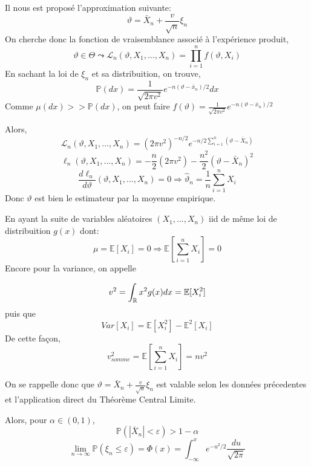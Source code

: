 \documentclass{article}
\newcommand{\mean}{\mathbb{E}}
\newcommand{\R}{\mathbb{R}}
\begin{document}
Il nous est proposé l'approximation suivante:
$$\vartheta=\bar X_n + \frac{v}{\sqrt{n}}\xi_n$$
On cherche donc la fonction de vraisemblance associé à l'expérience produit,
$$\vartheta \in \Theta \leadsto \mathcal{L}_n(\vartheta,X_1,...,X_n )= \prod_{i=1}^nf(\vartheta,X_i) $$
En sachant la loi de $\displaystyle \xi_n$ et sa distribuition, on trouve,
$$\mathbb{P}(dx)=\frac{1}{\sqrt{2\pi v^2}}e^{-n(\vartheta-\bar x_n)/2}dx$$
Comme $\displaystyle \mu(dx)>> \mathbb{P}(dx)$, on peut faire $\displaystyle f(\vartheta)=\frac{1}{\sqrt{2\pi v^2}}e^{-n(\vartheta-\bar x_n)/2}$

Alors,
$$\mathcal{L}_n(\vartheta,X_1,...,X_n )=(2\pi v^2)^{-n/2}e^{-n/2\sum_{i=1}^n(\vartheta - \bar X_ n)}$$
$$\ell_n(\vartheta,X_1,...,X_n )=-\frac{n}{2}(2\pi v^2)-\frac{n^2}{2}(\vartheta-\bar X_n)^2$$
$$\frac{d\ell_n}{d\vartheta}(\vartheta,X_1,...,X_n )=0 \Rightarrow\hat \vartheta_n=\frac{1}{n}\sum_{i=1}^nX_i$$
Donc $\displaystyle \vartheta$ est bien le estimateur par la moyenne empirique.



En ayant la suite de variables aléatoires $\displaystyle (X_1,...,X_n) $ iid de même loi de distribuition $\displaystyle g(x)$ dont:
$$\mu = \mean[X_i] = 0 \Rightarrow \mean[\sum_{i=1}^n X_i ] = 0 $$
Encore pour la variance, on appelle

$$\displaystyle v^2 = \int_{\cal \R} x^2g(x)dx = \mean[X_i^2]$$
puis que
$$\displaystyle Var[X_i] = \mean[X_i^2]-\mean^2[X_i] $$
De cette façon,
$$v_{somme}^2=\mean[\sum_{i=1}^n X_i ]= nv^2$$


On se rappelle donc que $\displaystyle\vartheta = \bar X_n + \frac{v}{\sqrt{n}}\xi_n$ est valable selon les données précedentes et l'application direct du Théorème Central Limite.

Alors, pour $\displaystyle \alpha\in(0,1)$,
$$\mathbb{P}(|\bar X_n |<\varepsilon)>1-\alpha$$
$$\lim_{n \to \infty}\mathbb{P}(\xi_n \leq \varepsilon)=\Phi(x) = \int_{-\infty}^xe^{-u^2/2}\frac{du}{\sqrt{2\pi}}$$
\end{document}
